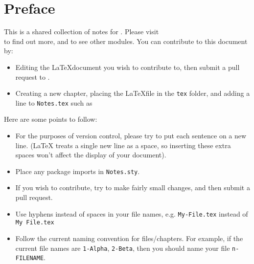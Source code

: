 \section*{Preface}
This is a shared collection of notes for \modulename. Please visit \\
\repolink to find out more, and to see other modules. You can contribute to this document by:
\begin{itemize}
	\item Editing the \LaTeX document you wish to contribute to, then submit a pull request to \repolink.
	\item Creating a new chapter, placing the \LaTeX file in the \verb|tex| folder, and adding a line to \verb|Notes.tex| such as \verb||
\end{itemize}
%
Here are some points to follow:
\begin{itemize}
	\item For the purposes of version control, please try to put each sentence on a new line. (\LaTeX{} treats a single new line as a space, so inserting these extra spaces won't affect the display of your document).
	\item Place any package imports in \verb|Notes.sty|.
	\item If you wish to contribute, try to make fairly small changes, and then submit a pull request.
	\item Use hyphens instead of spaces in your file names, e.g. \verb|My-File.tex| instead of \verb|My File.tex|
	\item Follow the current naming convention for files/chapters. For example, if the current file names are \verb|1-Alpha|, \verb|2-Beta|, then you should name your file \verb|n-FILENAME|.
\end{itemize}